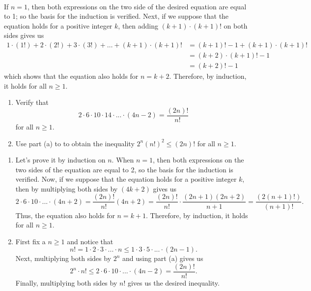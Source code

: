 \begin{solution}
    \\ If $n = 1$, then both expressions on the two side of the desired equation are equal to 1; so the basis for the induction is verified. Next, if we suppose that the equation holds for a positive integer $k$, then adding $(k+1)\cdot (k+1)!$ on both sides gives us
    \begin{align*}
        1\cdot (1!) + 2\cdot (2!) + 3\cdot (3!) + \dots + (k+1)\cdot (k+1)! &= (k+1)! - 1 + (k+1)\cdot(k+1)! \\
        &= (k+2)\cdot (k+1)! - 1 \\
        &= (k+2)! - 1
    \end{align*}
    which shows that the equation also holds for $n = k+2$. Therefore, by induction, it holds for all $n \geq 1$. \\
\end{solution}

\begin{exercise}
    \begin{enumerate}
        \item Verify that
        $$2\cdot 6 \cdot 10 \cdot 14 \cdot ... \cdot (4n-2) = \frac{(2n)!}{n!}$$
        for all $n \geq 1$.
        \item Use part (a) to to obtain the inequality $2^n (n!)^2 \leq (2n)!$ for all $n \geq 1$. \\
    \end{enumerate}
\end{exercise}

\begin{solution}
    \begin{enumerate}
        \item Let's prove it by induction on $n$. When $n = 1$, then both expressions on the two sides of the equation are equal to 2, so the basis for the induction is verified. Now, if we suppose that the equation holds for a positive integer $k$, then by multiplying both sides by $(4k+2)$ gives us
        $$2\cdot 6 \cdot 10 \cdot ... \cdot (4n+2) = \frac{(2n)!}{n!}(4n+2) = \frac{(2n)!}{n!}\cdot \frac{(2n+1)(2n+2)}{n+1} = \frac{(2(n+1)!)}{(n+1)!}.$$
        Thus, the equation also holds for $n =k+1$. Therefore, by induction, it holds for all $n \geq 1$.
        \item First fix a $n \geq 1$ and notice that
        $$n! = 1\cdot 2 \cdot 3 \cdot ... \cdot n \leq 1 \cdot 3 \cdot 5 \cdot ... \cdot (2n-1).$$ 
        Next, multiplying both sides by $2^n$ and using part (a) gives us
        $$2^n \cdot n! \leq 2 \cdot 6 \cdot 10 \cdot ... \cdot (4n-2) = \frac{(2n)!}{n!}.$$
        Finally, multiplying both sides by $n!$ gives us the desired inequality. 
    \end{enumerate}
\end{solution}

